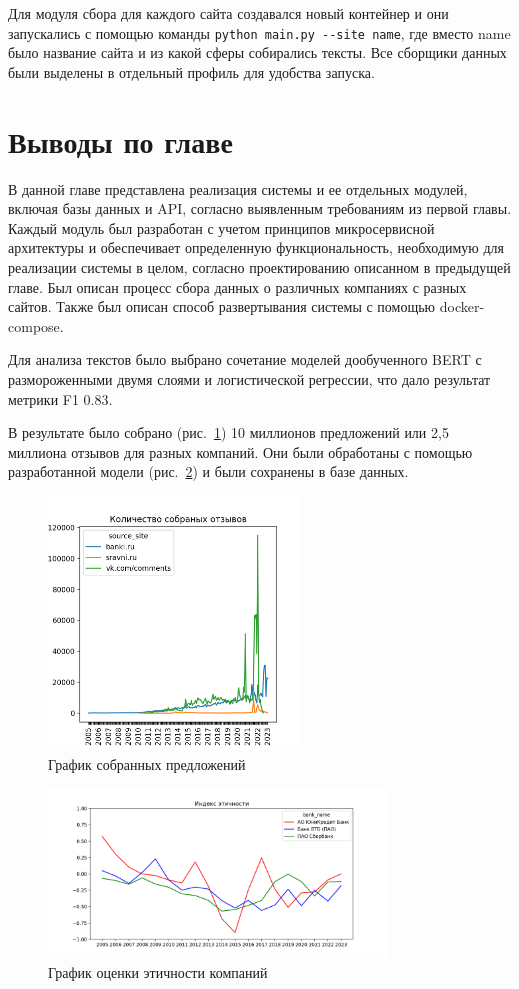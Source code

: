 \documentclass[PI, VKR]{HSEUniversity}
\begin{document}
Для модуля сбора для каждого сайта создавался новый контейнер и они запускались с помощью команды \texttt{python main.py -{}-site name}, где вместо name было название сайта и из какой сферы собирались тексты. Все сборщики данных были выделены в отдельный профиль для удобства запуска.
\section{Выводы по главе}
\label{sec:orge8e495c}
В данной главе представлена реализация системы и ее отдельных модулей, включая базы данных и API, согласно выявленным требованиям из первой главы. Каждый модуль был разработан с учетом принципов микросервисной архитектуры и обеспечивает определенную функциональность, необходимую для реализации системы в целом, согласно проектированию описанном в предыдущей главе. Был описан процесс сбора данных о различных компаниях с разных сайтов. Также был описан способ развертывания системы с помощью docker-compose.

Для анализа текстов было выбрано сочетание моделей дообученного BERT с размороженными двумя слоями и логистической регрессии, что дало результат метрики F1 0.83.

В результате было собрано (рис.~\ref{fig:collected_data}) 10 миллионов предложений или 2,5 миллиона отзывов для разных компаний. Они были обработаны с помощью разработанной модели (рис.~\ref{fig:ethics_analisys}) и были сохранены в базе данных.

\begin{figure}[h!]
\centering
\includegraphics[width=0.6\textwidth]{img/reviews_count.png}
\caption{\label{fig:collected_data}График собранных предложений}
\end{figure}

\begin{figure}[h!]
\centering
\includegraphics[width=0.8\textwidth]{img/ethics_plot_index_safe.png}
\caption{\label{fig:ethics_analisys}График оценки этичности компаний}
\end{figure}
\end{document}
